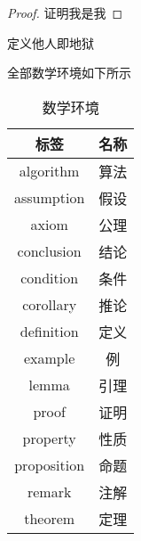 \begin{proof}
    证明我是我
\end{proof}

\begin{definition}[他人]
    定义他人即地狱
\end{definition}

全部数学环境如下所示

\begin{table}[htbp]
    \caption{数学环境}
    \label{tab:mathenv}
    \begin{tabular}{cc}
        \toprule
        标签 & 名称 \\
        \midrule
        algorithm & 算法 \\
        assumption & 假设 \\
        axiom & 公理 \\
        conclusion & 结论 \\
        condition & 条件 \\
        corollary & 推论 \\
        definition & 定义 \\
        example & 例 \\ 
        lemma & 引理 \\
        proof & 证明 \\
        property & 性质 \\
        proposition & 命题 \\
        remark & 注解 \\
        theorem & 定理 \\
        \bottomrule
    \end{tabular}
\end{table}
